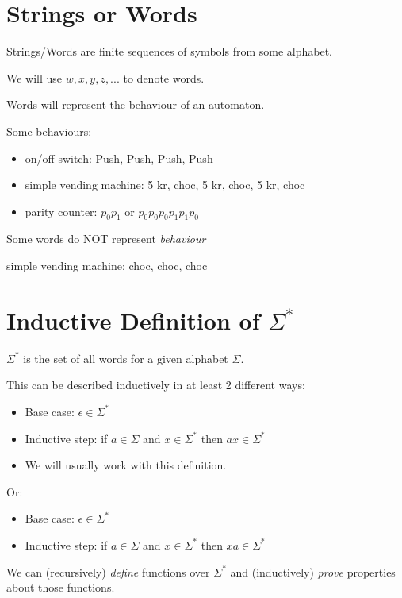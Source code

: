 \section{Strings or Words} %
\label{sec:strings_or_words}
\begin{Def}
    Strings/Words are finite sequences of symbols from some alphabet.
\end{Def}
\begin{Not}
    We will use $w,x,y,z,...$ to denote words.
\end{Not}
\begin{Rem}
    Words will represent the behaviour of an automaton.
\end{Rem}
\begin{Ex}
    Some behaviours:
    \begin{itemize}
        \item on/off-switch: Push, Push, Push, Push
        \item simple vending machine: 5 kr, choc, 5 kr, choc, 5 kr, choc
        \item parity counter: $p_0p_1$ or $p_0p_0p_0p_1p_1p_0$
    \end{itemize}
\end{Ex}
\begin{Rem}
    Some words do NOT represent \emph{behaviour}
\end{Rem}
\begin{Ex}
    simple vending machine: choc, choc, choc
\end{Ex}

\section{Inductive Definition of $\Sigma^*$} %
\label{sec:inductive_definition_of_}
\begin{Def}
    $\Sigma^*$ is the set of all words for a given alphabet $\Sigma$.
\end{Def}
This can be described inductively in at least 2 different ways:
\begin{itemize}
    \item Base case: $\epsilon \in \Sigma^*$
    \item Inductive step: if $a \in \Sigma$ and $x \in \Sigma^*$ then $ax \in \Sigma^*$
    \item We will usually work with this definition.
\end{itemize}
Or:
\begin{itemize}
    \item Base case: $\epsilon \in \Sigma^*$
    \item Inductive step: if $a \in \Sigma$ and $x \in \Sigma^*$ then $xa \in \Sigma^*$
\end{itemize}
We can (recursively) \emph{define} functions over $\Sigma^*$ and (inductively) \emph{prove} properties about those functions.

